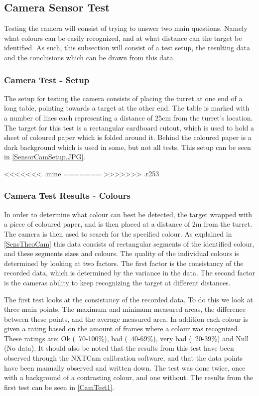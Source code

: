 \subsection{Camera Sensor Test}\label{CamTest}%
Testing the camera will consist of trying to answer two main questions. Namely
what colours can be easily recognized, and at what distance can the target be
identified. As such, this subsection will consist of a test setup, the resulting
data and the conclusions which can be drawn from this data.

\subsubsection{Camera Test - Setup}\label{CamTestSetup}
The setup for testing the camera consists of placing the turret at one end of a
long table, pointing towards a target at the other end. The table is marked with
a number of lines each representing a distance of 25cm from the turret's
location. The target for this test is a rectangular cardboard cutout, which is
used to hold a sheet of coloured paper which is folded around it. Behind the
coloured paper is a dark background which is used in some, but not all tests.
This setup can be seen in \autoref{SensorCamSetup.JPG}.

<<<<<<< .mine
=======
>>>>>>> .r253

\subsubsection{Camera Test Results - Colours}\label{CamTestColours}
In order to determine what colour can best be detected, the target wrapped with
a piece of coloured paper, and is then placed at a distance of 2m from the
turret. The camera is then used to search for the specified colour. As explained
in \autoref{SensTheoCam} this data consists of rectangular segments of the
identified colour, and these segments sizes and colours. The quality of the
individual colours is determined by looking at two factors. The first factor is
the consistancy of the recorded data, which is determined by the variance in the
data. The second factor is the cameras ability to keep recognizing the target
at different distances.\nl

The first test looks at the consistancy of the recorded data. To do this we look
at three main points. The maximum and minimum measured areas, the difference
between these points, and the average measured area. In addition each colour is
given a rating based on the amount of frames where a colour was recognized.
These ratings are: Ok (~70-100\%), bad (~40-69\%), very bad (~20-39\%) and Null
(No data). It should also be noted that the results from this test have been
observed through the NXTCam calibration software, and that the data points have
been manually observed and written down. The test was done twice, once with a
background of a contrasting colour, and one without. The results from the first
test can be seen in \autoref{CamTest1}.

